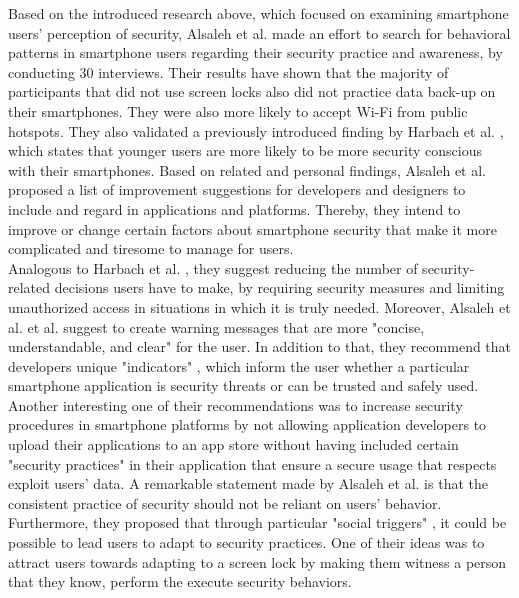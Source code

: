 Based on the introduced research above, which focused on examining smartphone users' perception of security, Alsaleh et al. \cite{Alsaleh} made an effort to search for behavioral patterns in smartphone users regarding their security practice and awareness, by conducting 30 interviews. Their results have shown that the majority of participants that did not use screen locks also did not practice data back-up on their smartphones. They were also more likely to accept Wi-Fi from public hotspots. They also validated a previously introduced finding by Harbach et al. \cite{Harbach:2016}, which states that younger users are more likely to be more security conscious with their smartphones. Based on related and personal findings, Alsaleh et al. \cite{Alsaleh} proposed a list of improvement suggestions for developers and designers to include and regard in applications and platforms. Thereby, they intend to improve or change certain factors about smartphone security that make it more complicated and tiresome to manage for users.\\

Analogous to Harbach et al. \cite{harbach}, they suggest reducing the number of security-related decisions users have to make, by requiring security measures and limiting unauthorized access in situations in which it is truly needed. Moreover, Alsaleh et al. \cite{Alsaleh} et al. suggest to create warning messages that are more "concise, understandable, and clear" \cite{Alsaleh} for the user. In addition to that, they recommend that developers unique "indicators" \cite{Alsaleh}, which inform the user whether a particular smartphone application is security threats or can be trusted and safely used. Another interesting one of their recommendations was to increase security procedures in smartphone platforms by not allowing application developers to upload their applications to an app store without having included certain "security practices" \cite{Alsaleh} in their application that ensure a secure usage that respects exploit users' data. A remarkable statement made by Alsaleh et al. \cite{Alsaleh} is that the consistent practice of security should not be reliant on users' behavior. Furthermore, they proposed that through particular "social triggers" \cite{Alsaleh}, it could be possible to lead users to adapt to security practices. One of their ideas was to attract users towards adapting to a screen lock by making them witness a person that they know, perform the execute security behaviors. \\

